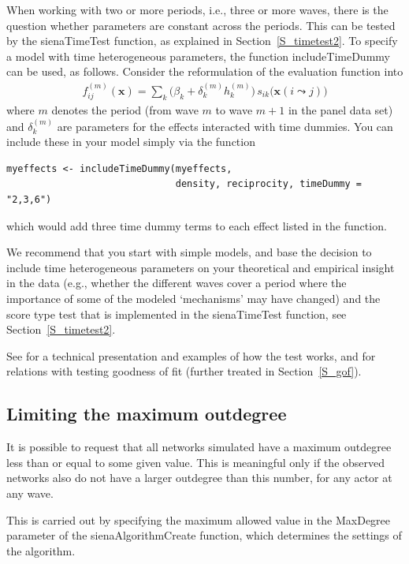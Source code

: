 \documentclass[a4paper,fleqn,11pt]{article}
\newcommand{\+}{\, + \,}
\newcommand{\sfn}[1]{\textsf{#1}}
\begin{document}
When working with two or more periods, i.e., three or more waves,
there is the question whether parameters are constant across the periods.
This can be tested by the \textsf{sienaTimeTest} function, as explained
in Section~\ref{S_timetest2}.
To specify a model with time heterogeneous parameters, the function
\sfn{includeTimeDummy} can be used, as follows.
Consider the reformulation of the evaluation function into
\begin{align}
f^{(m)}_{ij}(\mathbf{x})= \sum_k \Big(\beta_k + \delta_k^{(m)} h_k^{(m)}\Big)
                              \,      s_{ik}\big(\mathbf{x}(i \leadsto j)\big)
\label{eq:fmij}
\end{align}
where $m$ denotes the period (from wave $m$ to wave $m+1$
in the panel data set)
and $\delta_k^{(m)}$ are parameters for the effects interacted
with time dummies. You
can include these in your model simply via the function
\begin{verbatim}
myeffects <- includeTimeDummy(myeffects,
                              density, reciprocity, timeDummy = "2,3,6")
\end{verbatim}
which would add three time dummy terms to each effect listed in the function.

We recommend that you start with simple models,
and base the decision to include time heterogeneous parameters
on your theoretical and empirical insight in the data
(e.g., whether the different waves cover a period where the importance
of some of the modeled `mechanisms' may have changed) and
the score type test that is implemented in the \textsf{sienaTimeTest} function,
see Section~\ref{S_timetest2}.

See \citet{Lospinoso2011} for a technical presentation
and examples of how the test works,
and \citet{LospinosoSnijders2019} for relations with
testing goodness of fit (further treated in Section~\ref{S_gof}).


\subsection{Limiting the maximum outdegree}
\label{S_maxdegree}

It is possible to request that all networks simulated have a
maximum outdegree less than or equal to some given value.
This is meaningful only if the observed networks also do
not have a larger outdegree than this number, for any actor at any wave.

This is carried out by specifying the maximum allowed value
in the \textsf{MaxDegree} parameter of the \textsf{sienaAlgorithmCreate}
function, which determines the settings of the algorithm.
\end{document}
